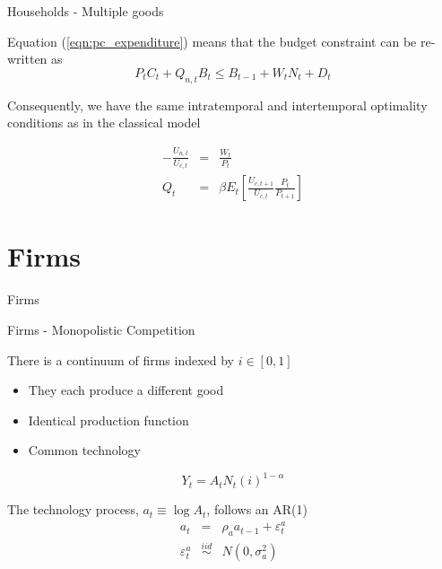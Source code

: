 \documentclass{beamer}
\begin{document}

	
\begin{frame}{Households - Multiple goods}

Equation (\ref{eqn:pc_expenditure}) means that the budget constraint can be re-written as
\begin{equation*}
P_{t} C_{t} + Q_{n,t} B_{t} \leq B_{t-1} + W_{t} N_{t} + D_{t}
\end{equation*}

Consequently, we have the same intratemporal and intertemporal optimality conditions as in the classical model

\begin{eqnarray*}
-\frac{U_{n,t}}{U_{c,t}} 	&=& \frac{W_{t}}{P_{t}} \\
Q_{t} 					&=& \beta E_{t} \left[ \frac{U_{c,t+1}}{U_{c,t}} \frac{P_{t}}{P_{t+1}} \right]
\end{eqnarray*}

\end{frame}

\section{Firms}

\begin{frame}

\begin{center}
{\LARGE Firms}
\end{center}

\end{frame}


	
\begin{frame}{Firms - Monopolistic Competition}

There is a continuum of firms indexed by $i\in[0,1]$
\begin{itemize}
\item	They each produce a different good
\item	Identical production function
\item	Common technology
\end{itemize}
\[
Y_{t} = A_{t}N_{t}(i)^{1-\alpha}
\]

\vspace{2mm}
The technology process, $a_{t}\equiv \log{A_{t}}$, follows an AR(1)
\begin{eqnarray*}
a_{t} 				&=& 					\rho_{a} a_{t-1} + \varepsilon_{t}^{a} \\
\varepsilon_{t}^{a}	&\stackrel{iid}{\sim}&	N\left(0,\sigma_{a}^{2}\right)
\end{eqnarray*}

\end{frame}
\end{document}
